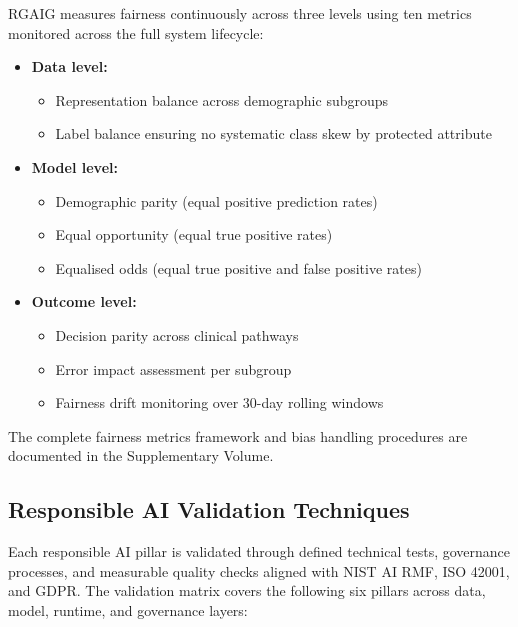 RGAIG measures fairness continuously across three levels using ten metrics monitored across the full system lifecycle:

\begin{itemize}[leftmargin=*, itemsep=3pt]
    \item \textbf{Data level:}
    \begin{itemize}[leftmargin=*, itemsep=2pt]
        \item Representation balance across demographic subgroups
        \item Label balance ensuring no systematic class skew by protected attribute
    \end{itemize}
    \item \textbf{Model level:}
    \begin{itemize}[leftmargin=*, itemsep=2pt]
        \item Demographic parity (equal positive prediction rates)
        \item Equal opportunity (equal true positive rates)
        \item Equalised odds (equal true positive and false positive rates)
    \end{itemize}
    \item \textbf{Outcome level:}
    \begin{itemize}[leftmargin=*, itemsep=2pt]
        \item Decision parity across clinical pathways
        \item Error impact assessment per subgroup
        \item Fairness drift monitoring over 30-day rolling windows
    \end{itemize}
\end{itemize}

\noindent The complete fairness metrics framework and bias handling procedures are documented in the Supplementary Volume.


\subsection{Responsible AI Validation Techniques}
\label{sec:rai_validation}


Each responsible AI pillar is validated through defined technical tests, governance processes, and measurable quality checks aligned with NIST AI RMF, ISO 42001, and GDPR. The validation matrix covers the following six pillars across data, model, runtime, and governance layers:


